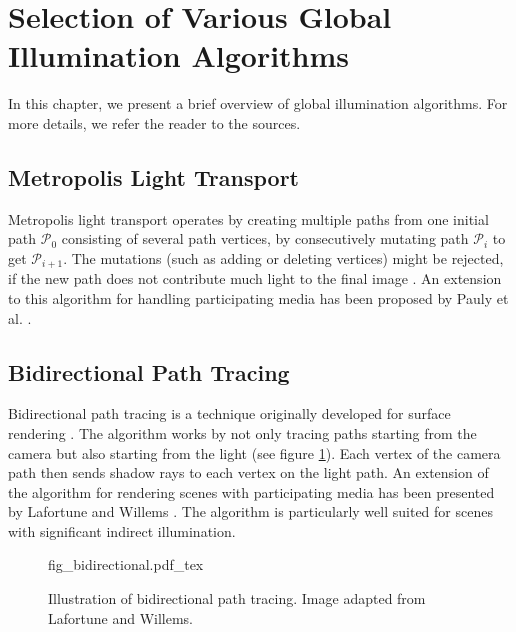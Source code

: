 \section{Selection of Various Global Illumination Algorithms}
\label{sec:mc_algorithms}
In this chapter, we present a brief overview of global illumination algorithms. For more details, we refer the reader to the sources.
\subsection{Metropolis Light Transport}
Metropolis light transport\cite{metropolis} operates by creating multiple paths from one initial path $\mathcal{P}_0$ consisting of several path vertices, by consecutively mutating path $\mathcal{P}_i$ to get $\mathcal{P}_{i+1}$. The mutations (such as adding or deleting vertices) might be rejected, if the new path does not contribute much light to the final image \cite{metropolis}. An extension to this algorithm for handling participating media has been proposed by Pauly et al. \cite{10.1007/978-3-7091-6303-0_2}.
\subsection{Bidirectional Path Tracing}
Bidirectional path tracing is a technique originally developed for surface rendering \cite{bidirectional-ray-tracing}. The algorithm works by not only tracing paths starting from the camera but also starting from the light (see figure \ref{fig:bidirectional}). Each vertex of the camera path then sends shadow rays to each vertex on the light path. An extension of the algorithm for rendering scenes with participating media has been presented by Lafortune and Willems \cite{10.5555/275458.275468}. The algorithm is particularly well suited for scenes with significant indirect illumination.
\begin{figure}
\centering
\def\svgwidth{\columnwidth}
{fig_bidirectional.pdf_tex}

\caption{Illustration of bidirectional path tracing. Image adapted from Lafortune and Willems\cite{10.5555/275458.275468}.}
\label{fig:bidirectional}
\end{figure}
